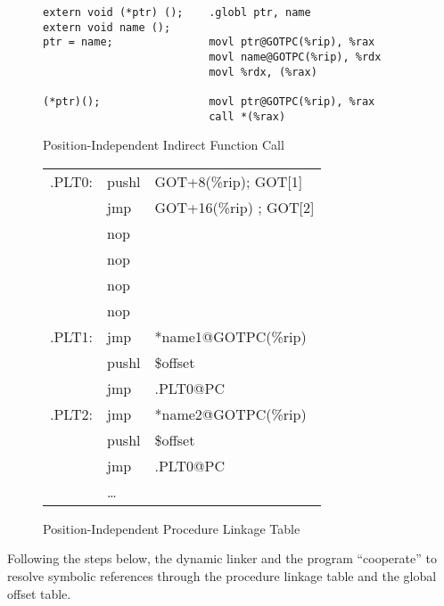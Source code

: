 \begin{figure}[H]
\caption{Position-Independent Indirect Function Call}
\begin{verbatim}
extern void (*ptr) ();    .globl ptr, name
extern void name ();
ptr = name;               movl ptr@GOTPC(%rip), %rax
                          movl name@GOTPC(%rip), %rdx
                          movl %rdx, (%rax)

(*ptr)();                 movl ptr@GOTPC(%rip), %rax
                          call *(%rax)
\end{verbatim}
\end{figure}

\begin{figure}[H]
\caption{Position-Independent Procedure Linkage Table}
\begin{tabular}{lll}
.PLT0: & pushl & GOT+8(\%rip); GOT[1]\\
& jmp &GOT+16(\%rip) ; GOT[2] \\
& nop & \\
& nop & \\
& nop & \\
& nop & \\
.PLT1: & jmp &*name1@GOTPC(\%rip)\\
& pushl & \$offset \\
&jmp &.PLT0@PC \\
.PLT2: & jmp&*name2@GOTPC(\%rip)\\
&pushl & \$offset \\
& jmp & .PLT0@PC \\
&\dots\\
\end{tabular}
\end{figure}


Following the steps below, the dynamic linker and the program
``cooperate'' to resolve symbolic references through the procedure
linkage table and the global offset table.


